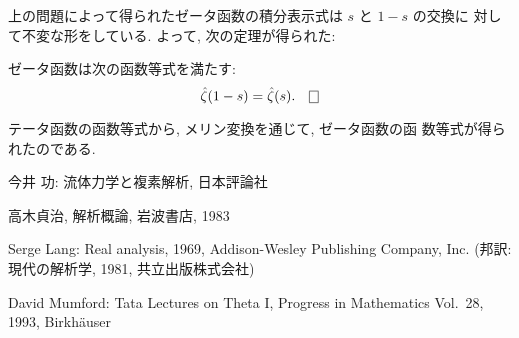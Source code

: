 \documentclass[12pt,twoside]{jarticle}
\begin{document}
上の問題によって得られたゼータ函数の積分表示式は $s$ と $1-s$ の交換に
対して不変な形をしている. よって, 次の定理が得られた:

\begin{theorem}[ゼータ函数の函数等式]
  ゼータ函数は次の函数等式を満たす:
  \[
    \hat\zeta(1-s) = \hat\zeta(s).
  \qed
  \]
\end{theorem}

\noindent テータ函数の函数等式から, メリン変換を通じて, ゼータ函数の函
数等式が得られたのである.


\begin{thebibliography}{AB}

今井 功: 流体力学と複素解析, 日本評論社

高木貞治, 解析概論, 岩波書店, 1983

Serge Lang: Real analysis, 1969, Addison-Wesley Publishing Company,
Inc. (邦訳: 現代の解析学, 1981, 共立出版株式会社)

David Mumford: Tata Lectures on Theta I,
Progress in Mathematics Vol.~28, 1993, Birkh\"auser

\end{thebibliography}

\end{document}
